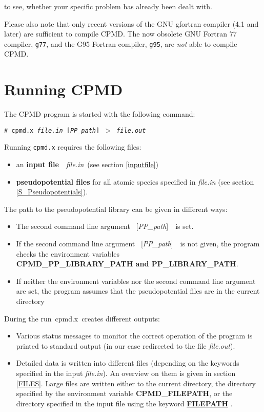 \documentclass[twoside,10pt,titlepage,a4paper]{article}
\newcommand{\referto}[2]{\hyperlink{#1}{#2}}
\newcommand{\referto}[2]{\htmlref{#2}{#1}}
\newcommand{\refkeyword}[1]{%
\referto{#1}{\textbf{#1}}%
\index{#1}%
}%
\newcommand{\shellcommand}[1]{%
  \vspace*{3mm}
  \noindent
  \texttt{\# #1}
  \vspace*{3mm}
}
\begin{document}
  to see, whether your specific problem has already been dealt with.

\vspace{7mm}
  Please also note that only recent versions of the GNU gfortran compiler
  (4.1 and later) are sufficient to compile CPMD. The now obsolete GNU 
  Fortran 77 compiler, \texttt{g77}, and the G95 Fortran compiler, 
  \texttt{g95}, are {\em not} able to compile CPMD.
  \clearpage
\section{Running CPMD}\label{runcpmd}
%
The CPMD program is started with the following command:

\shellcommand{cpmd.x {\sl file.in} [{\sl PP\_path}] $>$ {\sl file.out}}

Running \texttt{cpmd.x} requires the following files:
\begin{itemize}
  \item an {\bf input file}\ \ {\sl file.in}\ (see section \ref{inputfile})

  \item {\bf pseudopotential files} for all atomic species specified
        in {\sl file.in} (see section \ref{S_Pseudopotentials}).
\end{itemize}

\bigskip

The path to the pseudopotential library can be given in different ways:
\begin{itemize}

\item The second command line argument \ [{\sl PP\_path}]\ \ is set.

\item If the second command line argument \ [{\sl PP\_path}]\ \ is not
  given, the program checks the environment variables\\ {\bf
    CPMD\_PP\_LIBRARY\_PATH and PP\_LIBRARY\_PATH}.

\item If neither the environment variables nor the second command line
  argument are set, the program assumes that the pseudopotential files are
  in the current directory
\end{itemize}

During the run\ cpmd.x\ creates different outputs:
\begin{itemize}
\item Various status messages to monitor the correct operation of the program is
  printed to standard output (in our case redirected to the file {\sl file.out}).

\item
  Detailed data is written into different files (depending on the keywords
  specified in the input {\sl file.in}). An overview on them is given in section
  \ref{FILES}. Large files are written either to the current directory, the directory
  specified by the environment variable {\bf CPMD\_FILEPATH}, or the directory
  specified in the input file using the keyword \refkeyword{FILEPATH}.
\end{itemize}
\end{document}
